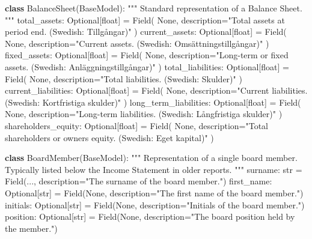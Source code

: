 \documentclass[
]{article}
\newenvironment{Shaded}{\begin{snugshade}}{\end{snugshade}}
\newcommand{\BuiltInTok}[1]{\textcolor[rgb]{0.00,0.23,0.31}{#1}}
\newcommand{\CommentTok}[1]{\textcolor[rgb]{0.37,0.37,0.37}{#1}}
\newcommand{\KeywordTok}[1]{\textcolor[rgb]{0.00,0.23,0.31}{\textbf{#1}}}
\newcommand{\NormalTok}[1]{\textcolor[rgb]{0.00,0.23,0.31}{#1}}
\newcommand{\OperatorTok}[1]{\textcolor[rgb]{0.37,0.37,0.37}{#1}}
\newcommand{\StringTok}[1]{\textcolor[rgb]{0.13,0.47,0.30}{#1}}
\newcommand{\VariableTok}[1]{\textcolor[rgb]{0.07,0.07,0.07}{#1}}
\begin{document}
\begin{Shaded}
\begin{Highlighting}[]
\KeywordTok{class}\NormalTok{ BalanceSheet(BaseModel):}
    \CommentTok{"""}
\CommentTok{    Standard representation of a Balance Sheet.}
\CommentTok{    """}
\NormalTok{    total\_assets: Optional[}\BuiltInTok{float}\NormalTok{] }\OperatorTok{=}\NormalTok{ Field(}
        \VariableTok{None}\NormalTok{, description}\OperatorTok{=}\StringTok{"Total assets at period end. (Swedish: Tillgångar)"}
\NormalTok{    )}
\NormalTok{    current\_assets: Optional[}\BuiltInTok{float}\NormalTok{] }\OperatorTok{=}\NormalTok{ Field(}
        \VariableTok{None}\NormalTok{, description}\OperatorTok{=}\StringTok{"Current assets. (Swedish: Omsättningstillgångar)"}
\NormalTok{    )}
\NormalTok{    fixed\_assets: Optional[}\BuiltInTok{float}\NormalTok{] }\OperatorTok{=}\NormalTok{ Field(}
        \VariableTok{None}\NormalTok{, description}\OperatorTok{=}\StringTok{"Long{-}term or fixed assets. (Swedish: Anläggningstillgångar)"}
\NormalTok{    )}
\NormalTok{    total\_liabilities: Optional[}\BuiltInTok{float}\NormalTok{] }\OperatorTok{=}\NormalTok{ Field(}
        \VariableTok{None}\NormalTok{, description}\OperatorTok{=}\StringTok{"Total liabilities. (Swedish: Skulder)"}
\NormalTok{    )}
\NormalTok{    current\_liabilities: Optional[}\BuiltInTok{float}\NormalTok{] }\OperatorTok{=}\NormalTok{ Field(}
        \VariableTok{None}\NormalTok{, description}\OperatorTok{=}\StringTok{"Current liabilities. (Swedish: Kortfristiga skulder)"}
\NormalTok{    )}
\NormalTok{    long\_term\_liabilities: Optional[}\BuiltInTok{float}\NormalTok{] }\OperatorTok{=}\NormalTok{ Field(}
        \VariableTok{None}\NormalTok{, description}\OperatorTok{=}\StringTok{"Long{-}term liabilities. (Swedish: Långfristiga skulder)"}
\NormalTok{    )}
\NormalTok{    shareholders\_equity: Optional[}\BuiltInTok{float}\NormalTok{] }\OperatorTok{=}\NormalTok{ Field(}
        \VariableTok{None}\NormalTok{, description}\OperatorTok{=}\StringTok{"Total shareholders\textquotesingle{} or owners\textquotesingle{} equity. (Swedish: Eget kapital)"}
\NormalTok{    )}


\KeywordTok{class}\NormalTok{ BoardMember(BaseModel):}
    \CommentTok{"""}
\CommentTok{    Representation of a single board member.}
\CommentTok{    Typically listed below the Income Statement in older reports.}
\CommentTok{    """}
\NormalTok{    surname: }\BuiltInTok{str} \OperatorTok{=}\NormalTok{ Field(..., description}\OperatorTok{=}\StringTok{"The surname of the board member."}\NormalTok{)}
\NormalTok{    first\_name: Optional[}\BuiltInTok{str}\NormalTok{] }\OperatorTok{=}\NormalTok{ Field(}\VariableTok{None}\NormalTok{, description}\OperatorTok{=}\StringTok{"The first name of the board member."}\NormalTok{)}
\NormalTok{    initials: Optional[}\BuiltInTok{str}\NormalTok{] }\OperatorTok{=}\NormalTok{ Field(}\VariableTok{None}\NormalTok{, description}\OperatorTok{=}\StringTok{"Initials of the board member."}\NormalTok{)}
\NormalTok{    position: Optional[}\BuiltInTok{str}\NormalTok{] }\OperatorTok{=}\NormalTok{ Field(}\VariableTok{None}\NormalTok{, description}\OperatorTok{=}\StringTok{"The board position held by the member."}\NormalTok{)}



\end{Highlighting}
\end{Shaded}
\end{document}
